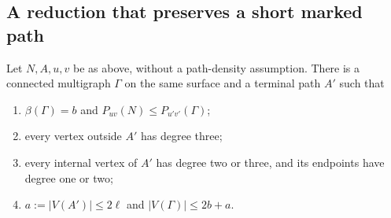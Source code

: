 \subsection{A reduction that preserves a short marked path}

\begin{lemma}\label{lem:path-planar-split}
Let $N,A,u,v$ be as above, without a path-density assumption.
There is a connected multigraph $\Gamma$ on the same surface and a terminal path $A'$ such that
\begin{enumerate}
\item $\beta(\Gamma)=b$ and $P_{uv}(N)\le P_{u'v'}(\Gamma)$;
\item every vertex outside $A'$ has degree three;
\item every internal vertex of $A'$ has degree two or three, and its endpoints have degree one or two;
\item $a:=|V(A')|\le2\ell$ and $|V(\Gamma)|\le2b+a$.
\end{enumerate}
\end{lemma}


